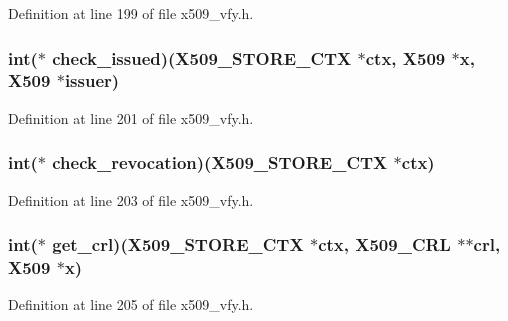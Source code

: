 Definition at line 199 of file x509\+\_\+vfy.\+h.

\subsubsection[{\texorpdfstring{check\+\_\+issued}{check_issued}}]{\setlength{\rightskip}{0pt plus 5cm}int($\ast$ check\+\_\+issued)({\bf X509\+\_\+\+S\+T\+O\+R\+E\+\_\+\+C\+TX} $\ast$ctx, {\bf X509} $\ast${\bf x}, {\bf X509} $\ast$issuer)}\hypertarget{structx509__store__st_a1d9c17fcd1eb6255bb12ff3e6cf2852b}{}\label{structx509__store__st_a1d9c17fcd1eb6255bb12ff3e6cf2852b}


Definition at line 201 of file x509\+\_\+vfy.\+h.

\subsubsection[{\texorpdfstring{check\+\_\+revocation}{check_revocation}}]{\setlength{\rightskip}{0pt plus 5cm}int($\ast$ check\+\_\+revocation)({\bf X509\+\_\+\+S\+T\+O\+R\+E\+\_\+\+C\+TX} $\ast$ctx)}\hypertarget{structx509__store__st_ac12df49e4e4808ab998230f834870cce}{}\label{structx509__store__st_ac12df49e4e4808ab998230f834870cce}


Definition at line 203 of file x509\+\_\+vfy.\+h.

\subsubsection[{\texorpdfstring{get\+\_\+crl}{get_crl}}]{\setlength{\rightskip}{0pt plus 5cm}int($\ast$ get\+\_\+crl)({\bf X509\+\_\+\+S\+T\+O\+R\+E\+\_\+\+C\+TX} $\ast$ctx, {\bf X509\+\_\+\+C\+RL} $\ast$$\ast$crl, {\bf X509} $\ast${\bf x})}\hypertarget{structx509__store__st_af9ee5fc1ed05834912007fd603bf8b86}{}\label{structx509__store__st_af9ee5fc1ed05834912007fd603bf8b86}


Definition at line 205 of file x509\+\_\+vfy.\+h.

